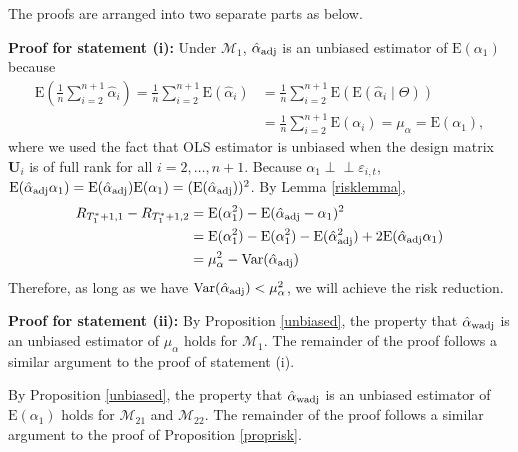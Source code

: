 \documentclass[11pt]{article}
\def\mbf#1{\mathbf{#1}} %
\newcommand{\indep}{\perp \!\!\! \perp } %
\def\mrm#1{\mathrm{#1}} %
\def\mc#1{\mathcal{#1}} %
\def\E#1{\mathrm{E}(#1)} %
\def\var#1{\mathrm{Var}(#1)} %
\theoremstyle{definition}
\newenvironment{proof-of-proposition}[1][{}]{\noindent{\bf
    Proof of Proposition {#1}}
  \hspace*{.5em}}{\qed\bigskip\\}
\begin{document}
\begin{proof-of-proposition}[\ref{proprisk}] The proofs are arranged into two separate parts as below.

 \textbf{Proof for statement (i):} Under $\mc{M}_1$, $\hat{\alpha}_{\rm adj}$ is an unbiased estimator of $\E{\alpha_1}$ because
  \begin{align*}
   \mrm{E}\left( \frac{1}{n}\sum_{i=2}^{n+1} \hat{\alpha}_i\right)
   = \frac{1}{n}\sum_{i=2}^{n+1}\E{\hat{\alpha}_i}
   &= \frac{1}{n}\sum_{i=2}^{n+1}\E{\E{\hat{\alpha}_i\mid \Theta}}\\
   &=  \frac{1}{n}\sum_{i=2}^{n+1}\E{\alpha_i}
   = \mu_{\alpha}=\E{\alpha_1},
  \end{align*}
  where we used the fact that OLS estimator is unbiased when the design matrix $\mbf{U}_i$ is of full rank for all $i = 2, \ldots, n+1$. Because $\alpha_1\indep \varepsilon_{i,t}$, $\E{\hat{\alpha}_{\rm adj}\alpha_1}=\E{\hat{\alpha}_{\rm adj}}\E{\alpha_1}=(\E{\hat{\alpha}_{\rm adj}})^2$. By Lemma \ref{risklemma}, 
    \begin{align*}
    R_{T_1^*+1,1}-R_{T_1^*+1,2}
    &=\E{\alpha_1^2}-\E{\hat{\alpha}_{\rm adj}-\alpha_1}^2\\
   & =\E{\alpha_1^2}-\E{\alpha_1^2}- \E{\hat{\alpha}_{\rm adj}^2}+2\E{\hat{\alpha}_{\rm adj}\alpha_1} \\
   &= \mu_{\alpha}^2 - \var{\hat{\alpha}_{\rm adj}} 
  \end{align*}
  Therefore, as long as we have $\var{\hat{\alpha}_{\rm adj}}<\mu_{\alpha}^2$, we will achieve the risk reduction. 

 \textbf{Proof for statement (ii):} By Proposition \ref{unbiased}, the property that $\hat{\alpha}_{\rm wadj}$ is an unbiased estimator of $\mu_{\alpha}$ holds for $\mc{M}_{1}$. The remainder of the proof follows a similar argument to the proof of statement (i).
\end{proof-of-proposition}



\begin{proof-of-proposition}[\ref{propriskwadj2}]
  By Proposition \ref{unbiased}, the property that $\hat{\alpha}_{\rm wadj}$ is an unbiased estimator of $\E{\alpha_1}$ holds for $\mc{M}_{21}$ and $\mc{M}_{22}$. The remainder of the proof follows a similar argument to the proof of Proposition \ref{proprisk}.
\end{proof-of-proposition}









\end{document}
